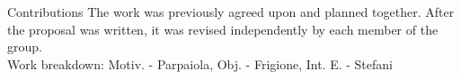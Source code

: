 \begin{projsection}{Contributions}
	The work was previously agreed upon and planned together.
	After the proposal was written, it was revised independently by each member of the group.\\
	Work breakdown: Motiv. - Parpaiola, Obj. - Frigione, Int. E. - Stefani
\end{projsection}
